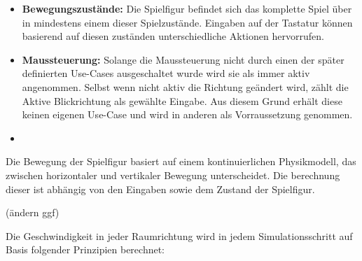 \documentclass{article}
\begin{document}
\begin{itemize}
  \item \textbf{Bewegungszustände:} Die Spielfigur befindet sich das komplette Spiel über in mindestens einem dieser Spielzustände. Eingaben auf der Tastatur können basierend auf diesen zuständen unterschiedliche Aktionen hervorrufen.
  \item \textbf{Maussteuerung:} Solange die Maussteuerung nicht durch einen der später definierten Use-Cases ausgeschaltet wurde wird sie als immer aktiv angenommen. Selbst wenn nicht aktiv die Richtung geändert wird, zählt die Aktive Blickrichtung als gewählte Eingabe. Aus diesem Grund erhält diese keinen eigenen Use-Case und wird in anderen als Vorraussetzung genommen.
  \item 


\end{itemize}

Die Bewegung der Spielfigur basiert auf einem kontinuierlichen Physikmodell, das zwischen horizontaler und vertikaler Bewegung unterscheidet. Die berechnung dieser ist abhängig von den Eingaben sowie dem Zustand der Spielfigur. 


(ändern ggf)


Die Geschwindigkeit in jeder Raumrichtung wird in jedem Simulationsschritt auf Basis folgender Prinzipien berechnet:
\end{document}
